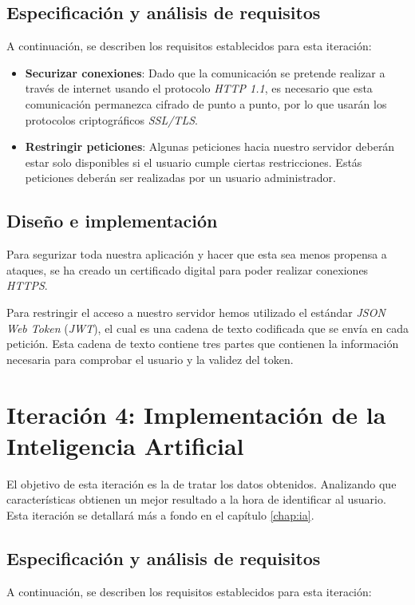 \subsection{Especificación y análisis de requisitos}
A continuación, se describen los requisitos establecidos para esta iteración:

\begin{itemize}
    \item \textbf{Securizar  conexiones}: Dado que la comunicación se pretende realizar a través de internet usando el protocolo \textit{HTTP 1.1}, es necesario que esta comunicación permanezca cifrado de punto a punto, por lo que usarán los protocolos criptográficos \textit{SSL/TLS}.
    
    \item \textbf{Restringir peticiones}: Algunas peticiones hacia nuestro servidor deberán estar solo disponibles si el usuario cumple ciertas restricciones. Estás peticiones deberán ser realizadas por un usuario administrador.
    
\end{itemize}

\subsection{Diseño e implementación}

Para segurizar toda nuestra aplicación y hacer que esta sea menos propensa a ataques, se ha creado un certificado digital para poder realizar conexiones \textit{HTTPS}.

Para restringir el acceso a nuestro servidor hemos utilizado el estándar \textit{JSON Web Token} (\textit{JWT}), el cual es una cadena de texto codificada que se envía en cada petición. Esta cadena de texto contiene tres partes que contienen la información necesaria para comprobar el usuario y la validez del token.

 \section{Iteración 4: Implementación de la Inteligencia Artificial}
 
 El objetivo de esta iteración es la de tratar los datos obtenidos. Analizando que características obtienen un mejor resultado a la hora de identificar al usuario. Esta iteración se detallará más a fondo en el capítulo \ref{chap:ia}.
 
 \subsection{Especificación y análisis de requisitos}
A continuación, se describen los requisitos establecidos para esta iteración:


